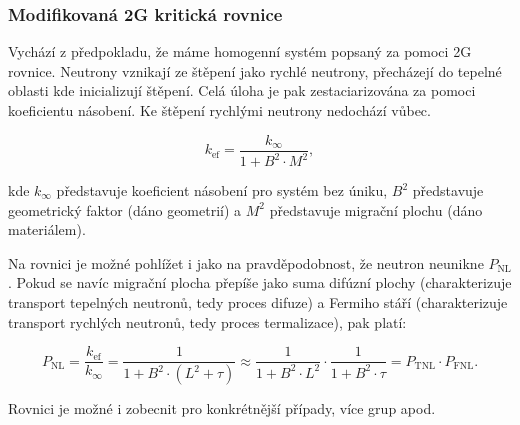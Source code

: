 \subsubsection{Modifikovaná 2G kritická rovnice}

Vychází z předpokladu, že máme homogenní systém popsaný za pomoci 2G rovnice. Neutrony vznikají ze štěpení jako rychlé neutrony, přecházejí do tepelné oblasti kde inicializují štěpení. Celá úloha je pak zestaciarizována za pomoci koeficientu násobení. Ke štěpení rychlými neutrony nedochází vůbec.

$$ k_\text{ef} = \dfrac{k_\infty}{1 + B^2 \cdot M^2}, $$

kde $k_\infty$ představuje koeficient násobení pro systém bez úniku, $B^2$ představuje geometrický faktor (dáno geometrií) a $M^2$ představuje migrační plochu (dáno materiálem).

Na rovnici je možné pohlížet i jako na pravděpodobnost, že neutron neunikne $P_\text{NL}$. Pokud se navíc migrační plocha přepíše jako suma difúzní plochy (charakterizuje transport tepelných neutronů, tedy proces difuze) a Fermiho stáří (charakterizuje transport rychlých neutronů, tedy proces termalizace), pak platí:

$$ P_\text{NL} = \dfrac{k_\text{ef}}{k_\infty} = \dfrac{1}{1 + B^2 \cdot (L^2 + \tau)} \approx \dfrac{1}{1 + B^2 \cdot L^2} \cdot \dfrac{1}{1 + B^2 \cdot \tau} = P_\text{TNL} \cdot P_\text{FNL}. $$

Rovnici je možné i zobecnit pro konkrétnější případy, více grup apod.